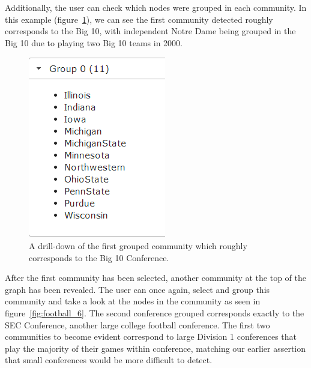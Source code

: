 \documentclass{article}\usepackage[]{graphicx}\usepackage[]{color}
\begin{document}
Additionally, the user can check which nodes were grouped in each community. In this example (figure~\ref{fig:football_5}), we can see the first community detected roughly corresponds to the Big 10, with independent Notre Dame being grouped in the Big 10 due to playing two Big 10 teams in 2000.

\begin{figure}[hbtp]
\centering
\includegraphics[width=\textwidth]{images/football_5.png}
\caption{\label{fig:football_5} A drill-down of the first grouped community which roughly corresponds to the Big 10 Conference.}
\end{figure}

After the first community has been selected, another community at the top of the graph has been revealed. The user can once again, select and group this community and take a look at the nodes in the community as seen in figure~\ref{fig:football_6}. The second conference grouped corresponds exactly to the SEC Conference, another large college football conference. The first two communities to become evident correspond to large Division 1 conferences that play the majority of their games within conference, matching our earlier assertion that small conferences would be more difficult to detect.
\end{document}
